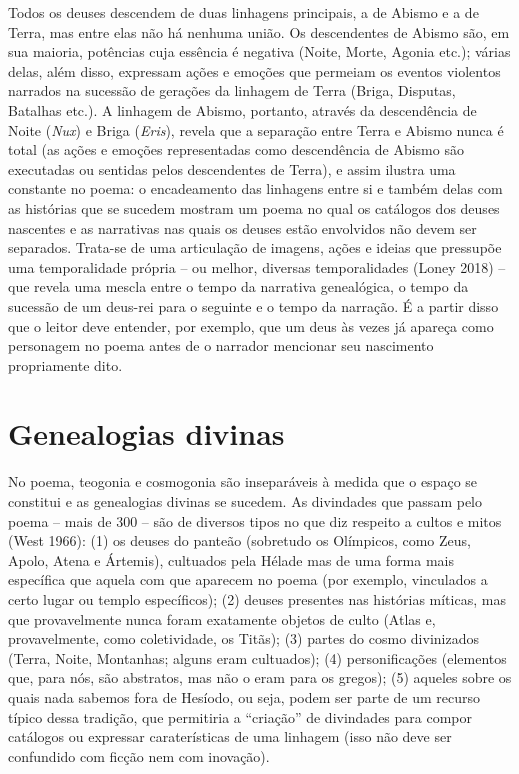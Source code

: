 Todos os deuses descendem de duas linhagens principais, a de Abismo e a
de Terra, mas entre elas não há nenhuma união. Os descendentes de Abismo
são, em sua maioria, potências cuja essência é negativa (Noite, Morte,
Agonia etc.); várias delas, além disso, expressam ações e emoções que
permeiam os eventos violentos narrados na sucessão de gerações da
linhagem de Terra (Briga, Disputas, Batalhas etc.). A linhagem de
Abismo, portanto, através da descendência de Noite (\emph{Nux}) e Briga
(\emph{Eris}), revela que a separação entre Terra e Abismo nunca é total
(as ações e emoções representadas como descendência de Abismo são
executadas ou sentidas pelos descendentes de Terra), e assim ilustra uma
constante no poema: o encadeamento das linhagens entre si e também delas
com as histórias que se sucedem mostram um poema no qual os catálogos
dos deuses nascentes e as narrativas nas quais os deuses estão
envolvidos não devem ser separados. Trata-se de uma articulação de
imagens, ações e ideias que pressupõe uma temporalidade própria -- ou
melhor, diversas temporalidades (Loney 2018) -- que revela uma mescla
entre o tempo da narrativa genealógica, o tempo da sucessão de um
deus-rei para o seguinte e o tempo da narração. É a partir disso que o
leitor deve entender, por exemplo, que um deus às vezes já apareça como
personagem no poema antes de o narrador mencionar seu nascimento
propriamente dito.

\section{Genealogias divinas}

No poema, teogonia e cosmogonia são inseparáveis à medida que o espaço
se constitui e as genealogias divinas se sucedem. As divindades que
passam pelo poema -- mais de 300 -- são de diversos tipos no que diz
respeito a cultos e mitos (West 1966): (1) os deuses do panteão
(sobretudo os Olímpicos, como Zeus, Apolo, Atena e Ártemis), cultuados
pela Hélade mas de uma forma mais específica que aquela com que aparecem
no poema (por exemplo, vinculados a certo lugar ou templo específicos);
(2) deuses presentes nas histórias míticas, mas que provavelmente nunca
foram exatamente objetos de culto (Atlas e, provavelmente, como
coletividade, os Titãs); (3) partes do cosmo divinizados (Terra, Noite,
Montanhas; alguns eram cultuados); (4) personificações (elementos que,
para nós, são abstratos, mas não o eram para os gregos); (5) aqueles
sobre os quais nada sabemos fora de Hesíodo, ou seja, podem ser parte de
um recurso típico dessa tradição, que permitiria a ``criação'' de
divindades para compor catálogos ou expressar caraterísticas de uma
linhagem (isso não deve ser confundido com ficção nem com inovação).

